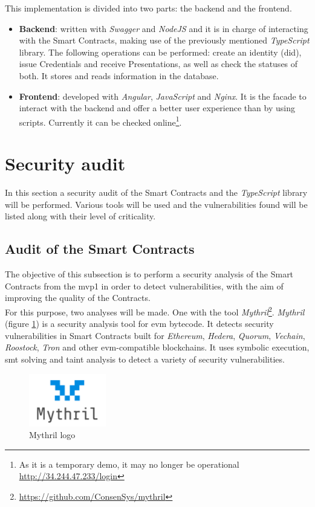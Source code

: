 \documentclass[a4paper, 12pt]{article} %
\begin{document}
            This implementation is divided into two parts: the backend and the frontend.
            \begin{itemize}
                \item \textbf{Backend}: written with \textit{Swagger} and \textit{NodeJS} and it is in charge of interacting with the Smart Contracts, making use of the previously mentioned \textit{TypeScript} library. The following operations can be performed: create an identity (\acrshort{did}), issue Credentials and receive Presentations, as well as check the statuses of both. It stores and reads information in the database.
                \item \textbf{Frontend}: developed with \textit{Angular}, \textit{JavaScript} and \textit{Nginx}. It is the facade to interact with the backend and offer a better user experience than by using scripts. Currently it can be checked online\footnote{As it is a temporary demo, it may no longer be operational \url{http://34.244.47.233/login}}.
            \end{itemize}
\newpage
\section{Security audit}
    In this section a security audit of the Smart Contracts and the \textit{TypeScript} library will be performed. Various tools will be used and the vulnerabilities found will be listed along with their level of criticality.
    
    \subsection{Audit of the Smart Contracts}
        The objective of this subsection is to perform a security analysis of the Smart Contracts from the  \acrshort{mvp}1 in order to detect vulnerabilities, with the aim of improving the quality of the Contracts.\\
        
        For this purpose, two analyses will be made. One with the tool \textit{Mythril}\footnote{\url{https://github.com/ConsenSys/mythril}}. \textit{Mythril} (figure \ref{fig:myth}) is a security analysis tool for \acrshort{evm} bytecode. It detects security vulnerabilities in Smart Contracts built for \textit{Ethereum}, \textit{Hedera}, \textit{Quorum}, \textit{Vechain}, \textit{Roostock}, \textit{Tron} and other \acrshort{evm}-compatible blockchains. It uses symbolic execution, \acrshort{smt} solving and taint analysis to detect a variety of security vulnerabilities.
        \begin{figure}[h]
            \centering
            \includegraphics[width=0.3\textwidth]{mythril_logo.png}
            \caption{Mythril logo}
            \label{fig:myth}
        \end{figure}
        
\end{document}
